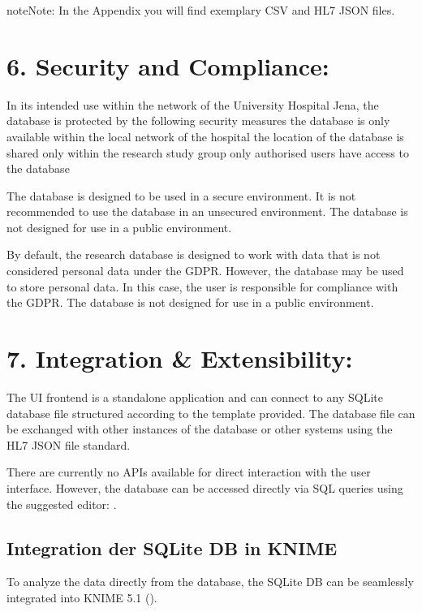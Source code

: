 \documentclass[a4paper,10pt,english]{sphinxmanual}
\begin{document}
\begin{sphinxadmonition}{note}{Note:}
\sphinxAtStartPar
In the Appendix you will find exemplary CSV and HL7 JSON files.
\end{sphinxadmonition}


\chapter{6. Security and Compliance:}
\label{\detokenize{TechnicalDetails:security-and-compliance}}
\sphinxAtStartPar
In its intended use within the network of the University Hospital Jena, the database is protected by the following security measures
\sphinxhyphen{} the database is only available within the local network of the hospital
\sphinxhyphen{} the location of the database is shared only within the research study group
\sphinxhyphen{} only authorised users have access to the database

\sphinxAtStartPar
The database is designed to be used in a secure environment. It is not recommended to use the database in an unsecured environment. The database is not designed for use in a public environment.

\sphinxAtStartPar
By default, the research database is designed to work with data that is not considered personal data under the GDPR. However, the database may be used to store personal data. In this case, the user is responsible for compliance with the GDPR. The database is not designed for use in a public environment.


\chapter{7. Integration \& Extensibility:}
\label{\detokenize{TechnicalDetails:integration-extensibility}}
\sphinxAtStartPar
The UI front\sphinxhyphen{}end is a standalone application and can connect to any SQLite database file structured according to the template provided. The database file can be exchanged with other instances of the database or other systems using the HL7 JSON file standard.

\sphinxAtStartPar
There are currently no APIs available for direct interaction with the user interface. However, the database can be accessed directly via SQL queries using the suggested  editor: .


\section{Integration der SQLite DB in KNIME}
\label{\detokenize{TechnicalDetails:integration-der-sqlite-db-in-knime}}
\sphinxAtStartPar
To analyze the data directly from the database, the SQLite DB can be seamlessly integrated into KNIME 5.1 ().
\end{document}

